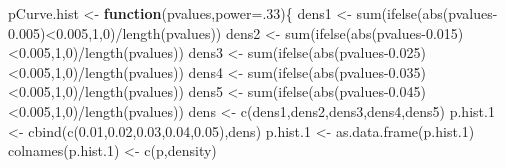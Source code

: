 \documentclass[
]{book}
\newenvironment{Shaded}{\begin{snugshade}}{\end{snugshade}}
\newcommand{\AttributeTok}[1]{\textcolor[rgb]{0.77,0.63,0.00}{#1}}
\newcommand{\ControlFlowTok}[1]{\textcolor[rgb]{0.13,0.29,0.53}{\textbf{#1}}}
\newcommand{\DecValTok}[1]{\textcolor[rgb]{0.00,0.00,0.81}{#1}}
\newcommand{\FloatTok}[1]{\textcolor[rgb]{0.00,0.00,0.81}{#1}}
\newcommand{\FunctionTok}[1]{\textcolor[rgb]{0.00,0.00,0.00}{#1}}
\newcommand{\NormalTok}[1]{#1}
\newcommand{\OtherTok}[1]{\textcolor[rgb]{0.56,0.35,0.01}{#1}}
\newcommand{\SpecialCharTok}[1]{\textcolor[rgb]{0.00,0.00,0.00}{#1}}
\newcommand{\StringTok}[1]{\textcolor[rgb]{0.31,0.60,0.02}{#1}}
\theoremstyle{definition}
\theoremstyle{definition}
\theoremstyle{definition}
\theoremstyle{definition}
\theoremstyle{remark}
\begin{document}
\begin{Shaded}
\begin{Highlighting}[]
\NormalTok{pCurve.hist }\OtherTok{\textless{}{-}} \ControlFlowTok{function}\NormalTok{(pvalues,}\AttributeTok{power=}\NormalTok{.}\DecValTok{33}\NormalTok{)\{}
\NormalTok{  dens1 }\OtherTok{\textless{}{-}} \FunctionTok{sum}\NormalTok{(}\FunctionTok{ifelse}\NormalTok{(}\FunctionTok{abs}\NormalTok{(pvalues}\FloatTok{{-}0.005}\NormalTok{)}\SpecialCharTok{\textless{}}\FloatTok{0.005}\NormalTok{,}\DecValTok{1}\NormalTok{,}\DecValTok{0}\NormalTok{)}\SpecialCharTok{/}\FunctionTok{length}\NormalTok{(pvalues))}
\NormalTok{  dens2 }\OtherTok{\textless{}{-}} \FunctionTok{sum}\NormalTok{(}\FunctionTok{ifelse}\NormalTok{(}\FunctionTok{abs}\NormalTok{(pvalues}\FloatTok{{-}0.015}\NormalTok{)}\SpecialCharTok{\textless{}}\FloatTok{0.005}\NormalTok{,}\DecValTok{1}\NormalTok{,}\DecValTok{0}\NormalTok{)}\SpecialCharTok{/}\FunctionTok{length}\NormalTok{(pvalues))}
\NormalTok{  dens3 }\OtherTok{\textless{}{-}} \FunctionTok{sum}\NormalTok{(}\FunctionTok{ifelse}\NormalTok{(}\FunctionTok{abs}\NormalTok{(pvalues}\FloatTok{{-}0.025}\NormalTok{)}\SpecialCharTok{\textless{}}\FloatTok{0.005}\NormalTok{,}\DecValTok{1}\NormalTok{,}\DecValTok{0}\NormalTok{)}\SpecialCharTok{/}\FunctionTok{length}\NormalTok{(pvalues))}
\NormalTok{  dens4 }\OtherTok{\textless{}{-}} \FunctionTok{sum}\NormalTok{(}\FunctionTok{ifelse}\NormalTok{(}\FunctionTok{abs}\NormalTok{(pvalues}\FloatTok{{-}0.035}\NormalTok{)}\SpecialCharTok{\textless{}}\FloatTok{0.005}\NormalTok{,}\DecValTok{1}\NormalTok{,}\DecValTok{0}\NormalTok{)}\SpecialCharTok{/}\FunctionTok{length}\NormalTok{(pvalues))}
\NormalTok{  dens5 }\OtherTok{\textless{}{-}} \FunctionTok{sum}\NormalTok{(}\FunctionTok{ifelse}\NormalTok{(}\FunctionTok{abs}\NormalTok{(pvalues}\FloatTok{{-}0.045}\NormalTok{)}\SpecialCharTok{\textless{}}\FloatTok{0.005}\NormalTok{,}\DecValTok{1}\NormalTok{,}\DecValTok{0}\NormalTok{)}\SpecialCharTok{/}\FunctionTok{length}\NormalTok{(pvalues))}
\NormalTok{  dens }\OtherTok{\textless{}{-}} \FunctionTok{c}\NormalTok{(dens1,dens2,dens3,dens4,dens5)}
\NormalTok{  p.hist}\FloatTok{.1} \OtherTok{\textless{}{-}} \FunctionTok{cbind}\NormalTok{(}\FunctionTok{c}\NormalTok{(}\FloatTok{0.01}\NormalTok{,}\FloatTok{0.02}\NormalTok{,}\FloatTok{0.03}\NormalTok{,}\FloatTok{0.04}\NormalTok{,}\FloatTok{0.05}\NormalTok{),dens)}
\NormalTok{  p.hist}\FloatTok{.1} \OtherTok{\textless{}{-}} \FunctionTok{as.data.frame}\NormalTok{(p.hist}\FloatTok{.1}\NormalTok{)}
  \FunctionTok{colnames}\NormalTok{(p.hist}\FloatTok{.1}\NormalTok{) }\OtherTok{\textless{}{-}} \FunctionTok{c}\NormalTok{(}\StringTok{\textquotesingle{}p\textquotesingle{}}\NormalTok{,}\StringTok{\textquotesingle{}density\textquotesingle{}}\NormalTok{)}

\end{Highlighting}
\end{Shaded}
\end{document}
